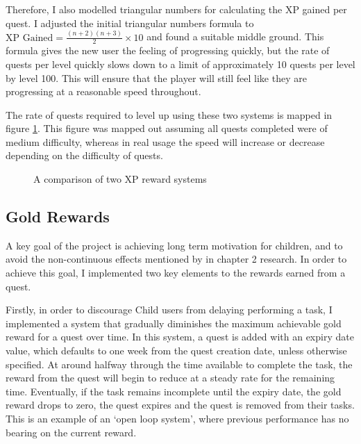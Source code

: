 Therefore, I also modelled triangular numbers for calculating the XP gained per quest. 
I adjusted the initial triangular numbers formula to $\textrm{XP Gained} = \frac{(n+2)(n+3)}{2} \times 10$ and found a suitable middle ground.
This formula gives the new user the feeling of progressing quickly, but the rate of quests per level quickly slows down to a limit of approximately 10 quests per level by level 100.
This will ensure that the player will still feel like they are progressing at a reasonable speed throughout.

The rate of quests required to level up using these two systems is mapped in figure \ref{fig:xprewardcomparison}.
This figure was mapped out assuming all quests completed were of medium difficulty, whereas in real usage the speed will increase or decrease depending on the difficulty of quests.

\begin{figure}
\centering
{}
\caption{A comparison of two XP reward systems}
\label{fig:xprewardcomparison}
\end{figure}

\subsection{Gold Rewards}
A key goal of the project is achieving long term motivation for children, and to avoid the non-continuous effects mentioned by \cite{deci2001extrinsic} in chapter 2 research.
In order to achieve this goal, I implemented two key elements to the rewards earned from a quest.

Firstly, in order to discourage Child users from delaying performing a task, I implemented a system that gradually diminishes the maximum achievable gold reward for a quest over time. 
In this system, a quest is added with an expiry date value, which defaults to one week from the quest creation date, unless otherwise specified.
At around halfway through the time available to complete the task, the reward from the quest will begin to reduce at a steady rate for the remaining time.
Eventually, if the task remains incomplete until the expiry date, the gold reward drops to zero, the quest expires and the quest is removed from their tasks.
This is an example of an `open loop system', where previous performance has no bearing on the current reward.

